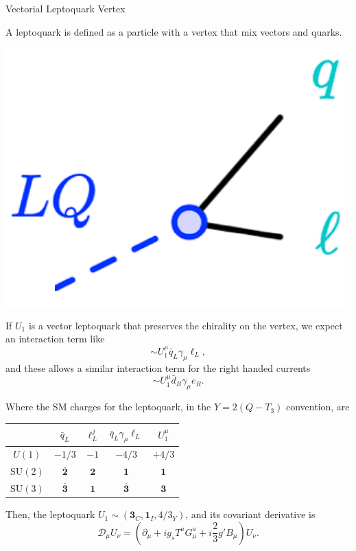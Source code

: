 \documentclass{../bredelebeamer}
\begin{document}
\begin{frame}{Vectorial Leptoquark Vertex}
	\begin{multicols}{2}
	A leptoquark is defined as a particle with a vertex that mix vectors and quarks.
	\begin{center}
	\includegraphics[width=.25\textwidth]{LQ_vertex.png}
	\end{center}
	If $U_1$ is a vector leptoquark that preserves the chirality on the vertex, we expect an interaction term like
	$$
	\sim U_1^\mu\bar{q}_{L} \gamma_{\mu} \ell_{L},
	$$
	and these allows a similar interaction term for the right handed currents 
	$$
	\sim U_1^\mu\bar{d}_{R} \gamma_{\mu} e_{R}.
	$$

	\end{multicols}
	Where the SM charges for the leptoquark, in the $Y=2(Q-T_3)$ convention, are
	\begin{center}
		\begin{tabular}{|c|c|c|c|c|}
			\hline & $\bar{q}_{L}$ & $\ell_{L}^{j}$ & $\bar{q}_{L}\gamma_{\mu} \ell_{L}$ & $U_{1}^{\mu}$ \\
			\hline$U(1)$ & $-1 / 3$ & $-1 $ & $-4 / 3$ & $+4 / 3$ \\
			\hline $\mathrm{SU}(2)$ & $\overline{\mathbf 2}$ & $\mathbf{2}$ & $\mathbf{1}$ & $\mathbf{1}$ \\
			\hline $\mathrm{SU}(3)$ & $\overline{\mathbf 3}$ & $\mathbf{1}$ & $\overline{\mathbf3}$ & $\mathbf{3}$ \\
			\hline
		\end{tabular}	
	\end{center}
	Then, the leptoquark $U_1 \sim \left(\mathbf{3}_{C}, \mathbf{1}_{I}, 4 / 3_{Y}\right)$, and its covariant derivative is
	$$
	\mathcal{D}_\mu U_\nu = \left(\partial_\mu+i g_s T^a G_\mu^a+ i \frac{2}{3} g' B_\mu \right)U_\nu.
	$$
\end{frame}
\end{document}
